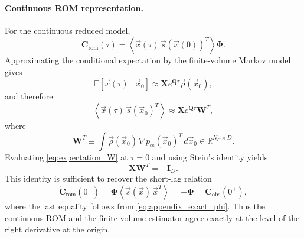 \documentclass[%
  prl,
  reprint,
  amsmath,
  amssymb,
  aps
]{revtex4-2}
\newcommand{\vvec}[1]{\vec{#1}}
\begin{document}
\paragraph{Continuous ROM representation.}
For the continuous reduced model,
\begin{equation}
    \dot{\bm{C}}_{\mathrm{rom}}(\tau)
    =
    \left\langle
        \vvec{x}(\tau)\,\vvec{s}(\vvec{x}(0))^T
    \right\rangle
    \bm{\Phi}.
\end{equation}
Approximating the conditional expectation by the finite-volume Markov model gives
\begin{equation}
    \mathbb{E}\!\left[\vvec{x}(\tau)\mid \vvec{x}_0\right]
    \approx
    \bm{X}e^{\bm{Q}\tau}\vvec{\rho}(\vvec{x}_0),
\end{equation}
and therefore
\begin{equation}
    \left\langle
        \vvec{x}(\tau)\,\vvec{s}(\vvec{x}_0)^T
    \right\rangle
    \approx
    \bm{X}e^{\bm{Q}\tau}\bm{W}^T,
\label{eq:expectation_W}
\end{equation}
where
\begin{equation}
    \bm{W}^T
    \equiv
    \int
    \vvec{\rho}(\vvec{x}_0)\,\nabla p_{\mathrm{ss}}(\vvec{x}_0)^T\,d\vvec{x}_0
    \in \mathbb{R}^{N_C\times D}.
\end{equation}
Evaluating \eqref{eq:expectation_W} at $\tau=0$ and using Stein's identity yields
\begin{equation}
    \bm{X}\bm{W}^T=-\bm{I}_D.
\label{eq:appendix_XW_identity}
\end{equation}
This identity is sufficient to recover the short-lag relation
\begin{equation}
    \dot{\bm{C}}_{\mathrm{rom}}(0^+)
    =
    \bm{\Phi}
    \left\langle
        \vvec{s}(\vvec{x})\,\vvec{x}^T
    \right\rangle
    =
    -\bm{\Phi}
    =
    \dot{\bm{C}}_{\mathrm{obs}}(0^+),
\end{equation}
where the last equality follows from \eqref{eq:appendix_exact_phi}. Thus the continuous ROM and the finite-volume estimator agree exactly at the level of the right derivative at the origin.
\end{document}
